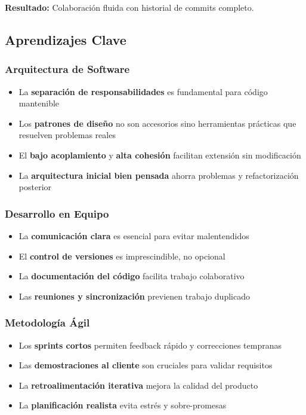 \documentclass[12pt, a4paper]{article}
\begin{document}
\textbf{Resultado:} Colaboración fluida con historial de commits completo.

\subsection{Aprendizajes Clave}

\subsubsection{Arquitectura de Software}

\begin{itemize}[leftmargin=2em]
    \item La \textbf{separación de responsabilidades} es fundamental para código mantenible
    \item Los \textbf{patrones de diseño} no son accesorios sino herramientas prácticas que resuelven problemas reales
    \item El \textbf{bajo acoplamiento} y \textbf{alta cohesión} facilitan extensión sin modificación
    \item La \textbf{arquitectura inicial bien pensada} ahorra problemas y refactorización posterior
\end{itemize}

\subsubsection{Desarrollo en Equipo}

\begin{itemize}[leftmargin=2em]
    \item La \textbf{comunicación clara} es esencial para evitar malentendidos
    \item El \textbf{control de versiones} es imprescindible, no opcional
    \item La \textbf{documentación del código} facilita trabajo colaborativo
    \item Las \textbf{reuniones y sincronización} previenen trabajo duplicado
\end{itemize}

\subsubsection{Metodología Ágil}

\begin{itemize}[leftmargin=2em]
    \item Los \textbf{sprints cortos} permiten feedback rápido y correcciones tempranas
    \item Las \textbf{demostraciones al cliente} son cruciales para validar requisitos
    \item La \textbf{retroalimentación iterativa} mejora la calidad del producto
    \item La \textbf{planificación realista} evita estrés y sobre-promesas
\end{itemize}
\end{document}
